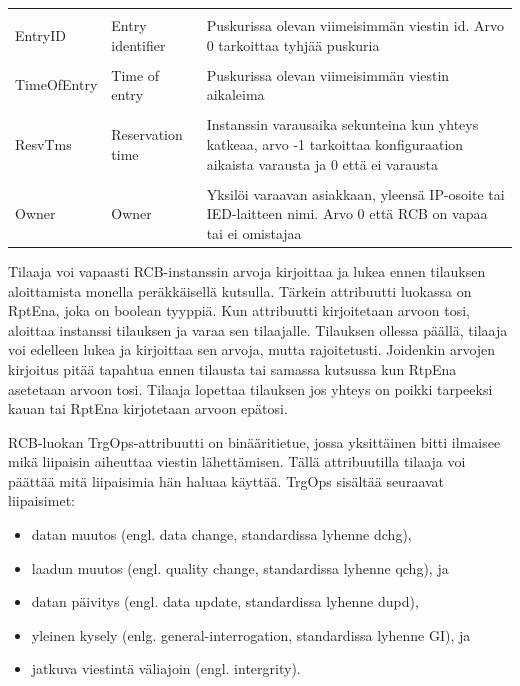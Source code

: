 \begin{table}[ht!]
\begin{tabular}{l | l | l}
		&\\
		EntryID & Entry identifier & \parbox[t]{7.5cm}{Puskurissa olevan viimeisimmän viestin id. Arvo 0 tarkoittaa tyhjää puskuria} \\
		&\\
		TimeOfEntry & Time of entry & \parbox[t]{7.5cm}{Puskurissa olevan viimeisimmän viestin aikaleima} \\
		&\\
		ResvTms & Reservation time & \parbox[t]{7.5cm}{Instanssin varausaika sekunteina kun yhteys katkeaa, arvo -1 tarkoittaa konfiguraation aikaista varausta ja 0 että ei varausta} \\
		&\\
		Owner & Owner & \parbox[t]{7.5cm}{Yksilöi varaavan asiakkaan, yleensä IP-osoite tai IED-laitteen nimi. Arvo 0 että RCB on vapaa tai ei omistajaa} \\
		\hline
	\end{tabular}
\end{table}

Tilaaja voi vapaasti RCB-instanssin arvoja kirjoittaa ja lukea ennen tilauksen aloittamista monella peräkkäisellä kutsulla. Tärkein attribuutti luokassa on RptEna, joka on boolean tyyppiä. Kun attribuutti kirjoitetaan arvoon tosi, aloittaa instanssi tilauksen ja varaa sen tilaajalle. Tilauksen ollessa päällä, tilaaja voi edelleen lukea ja kirjoittaa sen arvoja, mutta rajoitetusti. Joidenkin arvojen kirjoitus pitää tapahtua ennen tilausta tai samassa kutsussa kun RtpEna asetetaan arvoon tosi. Tilaaja lopettaa tilauksen jos yhteys on poikki tarpeeksi kauan tai RptEna kirjotetaan arvoon epätosi.

RCB-luokan TrgOps-attribuutti on binääritietue, jossa yksittäinen bitti ilmaisee mikä liipaisin aiheuttaa viestin lähettämisen. Tällä attribuutilla tilaaja voi päättää mitä liipaisimia hän haluaa käyttää. TrgOps sisältää seuraavat liipaisimet:
\begin{itemize}
	\item datan muutos (engl. data change, standardissa lyhenne dchg),
	\item laadun muutos (engl. quality change, standardissa lyhenne qchg), ja
	\item datan päivitys (engl. data update, standardissa lyhenne dupd),
	\item yleinen kysely (enlg. general-interrogation, standardissa lyhenne GI), ja 
	\item jatkuva viestintä väliajoin (engl. intergrity).
\end{itemize}

